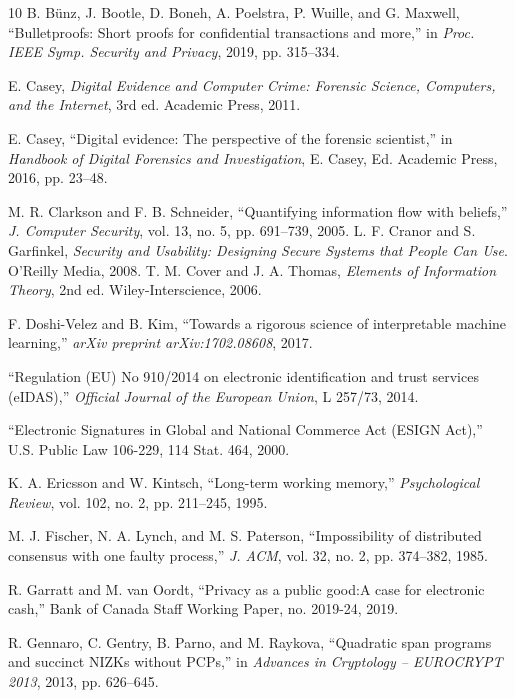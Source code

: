 \documentclass{ieeeaccess}
\begin{document}
\begin{thebibliography}{10}
B. Bünz, J. Bootle, D. Boneh, A. Poelstra, P. Wuille, and G. Maxwell, ``Bulletproofs: Short proofs for confidential transactions and more,'' in \emph{Proc. IEEE Symp. Security and Privacy}, 2019, pp. 315--334.

E. Casey, \emph{Digital Evidence and Computer Crime: Forensic Science, Computers, and the Internet}, 3rd ed. Academic Press, 2011.

E. Casey, ``Digital evidence: The perspective of the forensic scientist,'' in \emph{Handbook of Digital Forensics and Investigation}, E. Casey, Ed. Academic Press, 2016, pp. 23--48.

M. R. Clarkson and F. B. Schneider, ``Quantifying information flow with beliefs,'' \emph{J. Computer Security}, vol. 13, no. 5, pp. 691--739, 2005.
L. F. Cranor and S. Garfinkel, \emph{Security and Usability: Designing Secure Systems that People Can Use}. O'Reilly Media, 2008.
T. M. Cover and J. A. Thomas, \emph{Elements of Information Theory}, 2nd ed. Wiley-Interscience, 2006.

F. Doshi-Velez and B. Kim, ``Towards a rigorous science of interpretable machine learning,'' \emph{arXiv preprint arXiv:1702.08608}, 2017.

``Regulation (EU) No 910/2014 on electronic identification and trust services (eIDAS),'' \emph{Official Journal of the European Union}, L 257/73, 2014.

``Electronic Signatures in Global and National Commerce Act (ESIGN Act),'' U.S. Public Law 106-229, 114 Stat. 464, 2000.

K. A. Ericsson and W. Kintsch, ``Long-term working memory,'' \emph{Psychological Review}, vol. 102, no. 2, pp. 211--245, 1995.

M. J. Fischer, N. A. Lynch, and M. S. Paterson, ``Impossibility of distributed consensus with one faulty process,'' \emph{J. ACM}, vol. 32, no. 2, pp. 374--382, 1985.

R. Garratt and M. van Oordt, ``Privacy as a public good:A case for electronic cash,'' Bank of Canada Staff Working Paper, no. 2019-24, 2019.

R. Gennaro, C. Gentry, B. Parno, and M. Raykova, ``Quadratic span programs and succinct NIZKs without PCPs,'' in \emph{Advances in Cryptology -- EUROCRYPT 2013}, 2013, pp. 626--645.


\end{thebibliography}
\end{document}
